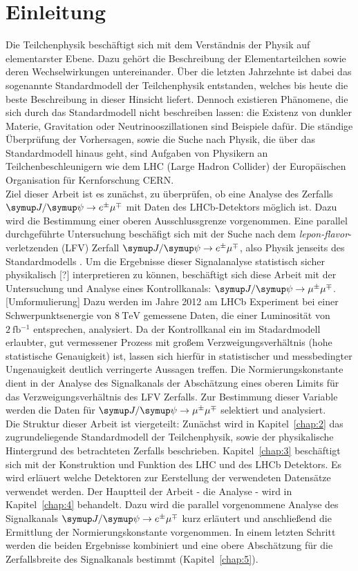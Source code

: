 \chapter{Einleitung}
%
Die Teilchenphysik beschäftigt sich mit dem Verständnis der Physik auf elementarster Ebene. Dazu gehört die Beschreibung der Elementarteilchen sowie deren Wechselwirkungen untereinander. Über die letzten Jahrzehnte ist dabei das sogenannte Standardmodell der Teilchenphysik entstanden, welches bis heute die beste Beschreibung in dieser Hinsicht liefert. Dennoch existieren Phänomene, die sich durch das Standardmodell nicht beschreiben lassen: die Existenz von dunkler Materie, Gravitation oder Neutrinooszillationen sind Beispiele dafür. Die ständige Überprüfung der Vorhersagen, sowie die Suche nach Physik, die über das Standardmodell hinaus geht, sind Aufgaben von Physikern an Teilchenbeschleunigern wie dem LHC (Large Hadron Collider) der Europäischen Organisation für Kernforschung CERN. \\
Ziel dieser Arbeit ist es zunächst, zu überprüfen, ob eine Analyse des Zerfalls $\signal$ mit Daten des LHCb-Detektors möglich ist. Dazu wird die Bestimmung einer oberen Ausschlussgrenze vorgenommen. Eine parallel durchgeführte Untersuchung beschäfigt sich mit der Suche nach dem \textit{lepon-flavor}-verletzenden (LFV) Zerfall $\signal$, also Physik jenseits des Standardmodells \cite{ba-maik}. Um die Ergebnisse dieser Signalanalyse statistisch sicher physikalisch [?] interpretieren zu können, beschäftigt sich diese Arbeit mit der Untersuchung und Analyse eines Kontrollkanals: $\kontroll$. [Umformulierung]
Dazu werden im Jahre 2012 am LHCb Experiment bei einer Schwerpunktsenergie von $\SI{8}{\tera\electronvolt}$ gemessene Daten, die einer Luminosität von $\SI{2}{\femto\barn^{-1}}$ entsprechen, analysiert. Da der Kontrollkanal ein im Stadardmodell erlaubter, gut vermessener Prozess mit großem Verzweigungsverhältnis (hohe statistische Genauigkeit) ist, lassen sich hierfür in statistischer und messbedingter Ungenauigkeit deutlich verringerte Aussagen treffen. Die Normierungskonstante dient in der Analyse des Signalkanals der Abschätzung eines oberen Limits für das Verzweigungsverhältnis des LFV Zerfalls. Zur Bestimmung dieser Variable werden die Daten für $\kontroll$ selektiert und analysiert.\\
Die Struktur dieser Arbeit ist viergeteilt: Zunächst wird in Kapitel~\ref{chap:2} das zugrundeliegende Standardmodell der Teilchenphysik, sowie der physikalische Hintergrund des betrachteten Zerfalls beschrieben. Kapitel~\ref{chap:3} beschäftigt sich mit der Konstruktion und Funktion des LHC und des LHCb Detektors. Es wird erläuert welche Detektoren zur Eerstellung der verwendeten Datensätze verwendet werden. Der Hauptteil der Arbeit - die Analyse - wird in Kapitel~\ref{chap:4} behandelt. Dazu wird die parallel vorgenommene Analyse des Signalkanals $\signal$ kurz erläutert und anschließend die Ermittlung der Normierungskonstante vorgenommen. In einem letzten Schritt werden die beiden Ergebnisse kombiniert und eine obere Abschätzung für die Zerfallsbreite des Signalkanals bestimmt (Kapitel~\ref{chap:5}).
